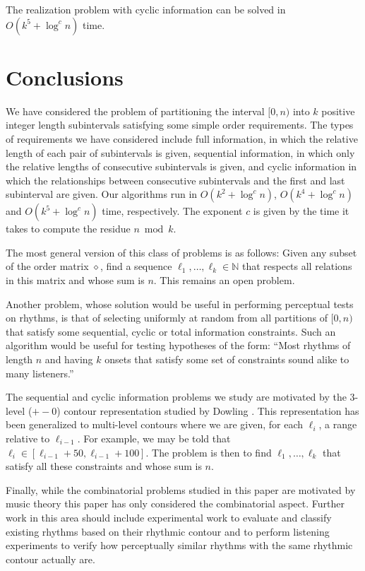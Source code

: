 \documentclass[11pt]{patmorin}
\newcommand{\N}{\mathbb{N}}
\newcommand{\op}{\diamond}
\begin{document}
\begin{thm}
The realization problem with cyclic information can be solved in
$O(k^5+\log^c n)$ time.
\end{thm}


\section{Conclusions}

We have considered the problem of partitioning the interval $[0,n)$
into $k$ positive integer length subintervals satisfying some simple
order requirements.  The types of requirements we have considered
include full information, in which the relative length of each pair of
subintervals is given, sequential information, in which only the
relative lengths of consecutive subintervals is given, and cyclic
information in which the relationships between consecutive
subintervals and the first and last subinterval are given.  Our
algorithms run in $O(k^2+\log^c n)$, $O(k^4+\log^c n)$ and
$O(k^5+\log^cn)$ time, respectively. The exponent $c$ is given by the
time it takes to compute the residue $n\bmod k$.

The most general version of this class of problems is as follows:
Given any subset of the order matrix $\op$, find a sequence
$\ell_1,\ldots,\ell_k\in\N$ that respects all relations in this matrix and
whose sum is $n$. This remains an open problem.

Another problem, whose solution would be useful in performing
perceptual tests on rhythms, is that of selecting uniformly at random
from all partitions of $[0,n)$ that satisfy some sequential, cyclic or
total information constraints.  Such an algorithm would be useful for
testing hypotheses of the form:  ``Most rhythms of length $n$ and
having $k$ onsets that satisfy some set of constraints sound alike to
many listeners.'' 

The sequential and cyclic information problems we study are motivated
by the 3-level ($+-0$) contour representation studied by Dowling
\cite{d78}.  This representation has been generalized to multi-level
contours \cite{l96,kcgv00} where we are given, for each $\ell_i$, a range
relative to $\ell_{i-1}$.  For example, we may be told that $\ell_{i}\in
[\ell_{i-1} + 50, \ell_{i-1}+100]$.  The problem is then to find
$\ell_1,\ldots,\ell_k$ that satisfy all these constraints and whose sum is
$n$.

Finally, while the combinatorial problems studied in this paper are
motivated by music theory this paper has only considered the
combinatorial aspect.  Further work in this area should include
experimental work to evaluate and classify existing rhythms based on
their rhythmic contour and to perform listening experiments to verify how
perceptually similar rhythms with the same rhythmic contour actually
are.
\end{document}
